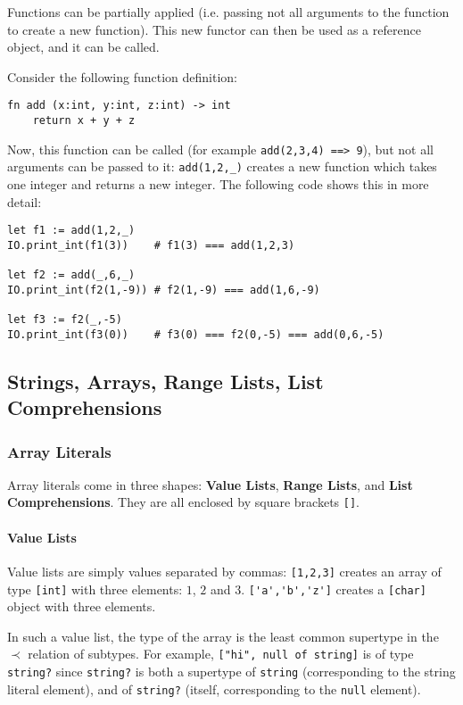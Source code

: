 \documentclass{article}
\newcommand{\code}[1]{\lstinline[columns=fixed]{#1}}
\newcommand{\subsubsubsection}{\paragraph}
\begin{document}
				Functions can be partially applied (i.e. passing not all arguments to the function to create a new function). This new functor can then be used as a reference object, and it can be called.
				
				Consider the following function definition:
				
				\begin{lstlisting}
fn add (x:int, y:int, z:int) -> int
	return x + y + z
				\end{lstlisting}
				
				Now, this function can be called (for example \code{add(2,3,4) ==> 9}), but not all arguments can be passed to it: \code{add(1,2,_)} creates a new function which takes one integer and returns a new integer. The following code shows this in more detail:
				
				\begin{lstlisting}
let f1 := add(1,2,_)
IO.print_int(f1(3))    # f1(3) === add(1,2,3)

let f2 := add(_,6,_)
IO.print_int(f2(1,-9)) # f2(1,-9) === add(1,6,-9)

let f3 := f2(_,-5)
IO.print_int(f3(0))    # f3(0) === f2(0,-5) === add(0,6,-5)
				\end{lstlisting}
		
		\subsection{Strings, Arrays, Range Lists, List Comprehensions}
		
			\subsubsection{Array Literals}
			
				Array literals come in three shapes: \textbf{Value Lists}, \textbf{Range Lists}, and \textbf{List Comprehensions}. They are all enclosed by square brackets \code{[]}.
				
				\subsubsubsection{Value Lists}
				
					Value lists are simply values separated by commas: \code{[1,2,3]} creates an array of type \code{[int]} with three elements: $1$, $2$ and $3$. \code{['a','b','z']} creates a \code{[char]} object with three elements.
					
					In such a value list, the type of the array is the least common supertype in the $\prec$ relation of subtypes. For example, \code{["hi", null of string]} is of type \code{string?} since \code{string?} is both a supertype of \code{string} (corresponding to the string literal element), and of \code{string?} (itself, corresponding to the \code{null} element).
					
\end{document}
